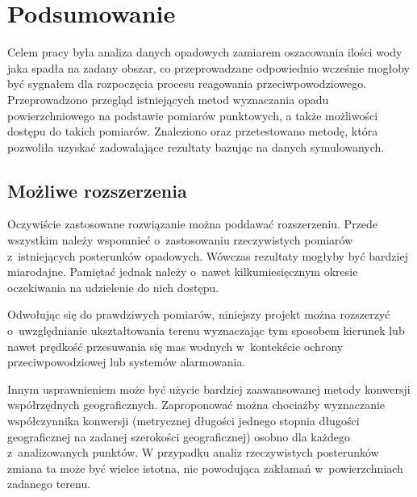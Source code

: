 \chapter{Podsumowanie}

Celem pracy była analiza danych opadowych zamiarem oszacowania ilości wody jaka spadła na zadany obszar, co przeprowadzane odpowiednio wcześnie mogłoby być sygnałem dla rozpoczęcia procesu reagowania przeciwpowodziowego. Przeprowadzono przegląd istniejących metod wyznaczania opadu powierzchniowego na podstawie pomiarów punktowych, a także możliwości dostępu do takich pomiarów. Znaleziono oraz przetestowano metodę, która pozwoliła uzyskać zadowalające rezultaty bazując na danych symulowanych.

\section{Możliwe rozszerzenia}
Oczywiście zastosowane rozwiązanie można poddawać rozszerzeniu. Przede wszystkim należy wspomnieć o~zastosowaniu rzeczywistych pomiarów z~istniejących posterunków opadowych. Wówczas rezultaty mogłyby być bardziej miarodajne. Pamiętać jednak należy o~nawet kilkumiesięcznym okresie oczekiwania na udzielenie do nich dostępu.

Odwołując się do prawdziwych pomiarów, niniejszy projekt można rozszerzyć o~uwzględnianie ukształtowania terenu wyznaczając tym sposobem kierunek lub nawet prędkość przesuwania się mas wodnych w~kontekście ochrony przeciwpowodziowej lub systemów alarmowania.

Innym usprawnieniem może być użycie bardziej zaawansowanej metody konwersji współrzędnych geograficznych. Zaproponować można chociażby wyznaczanie współczynnika konwersji (metrycznej długości jednego stopnia długości geograficznej na zadanej szerokości geograficznej) osobno dla każdego z~analizowanych punktów. W przypadku analiz rzeczywistych posterunków zmiana ta może być wielce istotna, nie powodująca zakłamań w~powierzchniach zadanego terenu.
